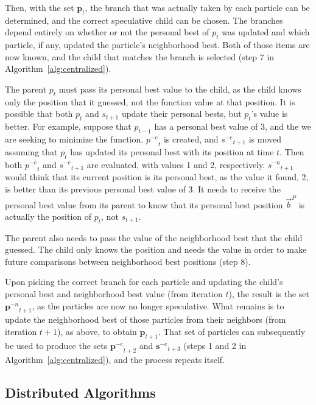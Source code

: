 \documentclass[journal,letterpaper]{IEEEtran}
\newcommand{\alg}[1]{Algorithm~\ref{alg:#1}}
\providecommand{\pers}{\ensuremath{P}}
\providecommand{\pbest}{\ensuremath{\Vec{b}^\pers}}
\providecommand{\noeval}[1]{\ensuremath{#1^{-e}}}
\providecommand{\nonbest}[1]{\ensuremath{#1^{-n}}}
\providecommand{\p}{\ensuremath{p}}
\providecommand{\pset}{\ensuremath{\mathbf{p}}}
\providecommand{\s}{\ensuremath{s}}
\providecommand{\sset}{\ensuremath{\mathbf{s}}}
\begin{document}
Then, with the set $\pset_t$, the branch that was actually taken by each
particle can be determined, and the correct speculative child can be chosen.
The branches depend entirely on whether or not the personal best of $p_t$ was
updated and which particle, if any, updated the particle's neighborhood best.
Both of those items are now known, and the child that matches the branch is
selected (step 7 in \alg{centralized}).

The parent $\p_t$ must pass its personal best value to the child, as the child
knows only the position that it guessed, not the function value at that
position.  It is possible that both $\p_t$ and $\s_{t+1}$ update their personal
bests, but $\p_t$'s value is better.  For example, suppose that $\p_{t-1}$ has
a personal best value of 3, and the we are seeking to minimize the function.
$\noeval{\p}_t$ is created, and $\noeval{\s}_{t+1}$ is moved assuming that
$\p_t$ has updated its personal best with its position at time $t$.  Then both
$\noeval{\p}_t$ and $\noeval{\s}_{t+1}$ are evaluated, with values 1 and 2,
respectively.  $\nonbest{\s}_{t+1}$ would think that its current position is
its personal best, as the value it found, 2, is better than its previous
personal best value of 3.  It needs to receive the personal best value from its
parent to know that its personal best position $\pbest$ is actually the
position of $\p_t$, not $\s_{t+1}$.

The parent also needs to pass the value of the neighborhood best that the child
guessed.  The child only knows the position and needs the value in order to
make future comparisons between neighborhood best positions (step 8).

Upon picking the correct branch for each particle and updating the child's
personal best and neighborhood best value (from iteration $t$), the result is
the set $\nonbest{\pset}_{t+1}$, as the particles are now no longer
speculative.  What remains is to update the neighborhood best of those
particles from their neighbors (from iteration $t+1$), as above, to obtain
$\pset_{t+1}$.  That set of particles can subsequently be used to produce the
sets $\noeval{\pset}_{t+2}$ and $\noeval{\sset}_{t+3}$ (steps 1 and 2 in
\alg{centralized}), and the process repeats itself.

\subsection{Distributed Algorithms}

\label{sec:distributed}
\end{document}
